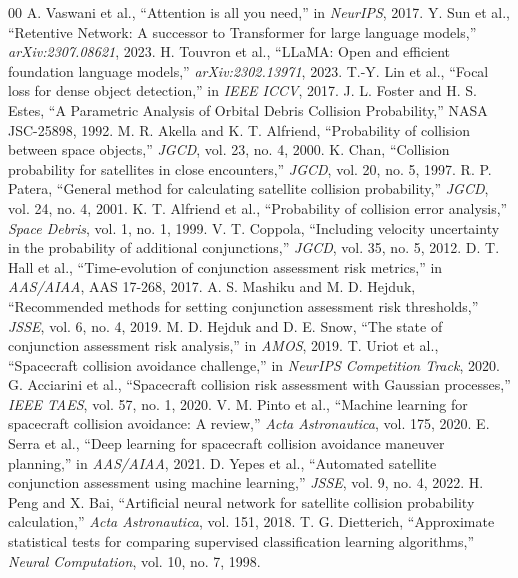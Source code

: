 \documentclass[conference]{IEEEtran}
\begin{document}
\begin{thebibliography}{00}
 A. Vaswani et al., ``Attention is all you need,'' in \textit{NeurIPS}, 2017.
 Y. Sun et al., ``Retentive Network: A successor to Transformer for large language models,'' \textit{arXiv:2307.08621}, 2023.
 H. Touvron et al., ``LLaMA: Open and efficient foundation language models,'' \textit{arXiv:2302.13971}, 2023.
 T.-Y. Lin et al., ``Focal loss for dense object detection,'' in \textit{IEEE ICCV}, 2017.
 J. L. Foster and H. S. Estes, ``A Parametric Analysis of Orbital Debris Collision Probability,'' NASA JSC-25898, 1992.
 M. R. Akella and K. T. Alfriend, ``Probability of collision between space objects,'' \textit{JGCD}, vol. 23, no. 4, 2000.
 K. Chan, ``Collision probability for satellites in close encounters,'' \textit{JGCD}, vol. 20, no. 5, 1997.
 R. P. Patera, ``General method for calculating satellite collision probability,'' \textit{JGCD}, vol. 24, no. 4, 2001.
 K. T. Alfriend et al., ``Probability of collision error analysis,'' \textit{Space Debris}, vol. 1, no. 1, 1999.
 V. T. Coppola, ``Including velocity uncertainty in the probability of additional conjunctions,'' \textit{JGCD}, vol. 35, no. 5, 2012.
 D. T. Hall et al., ``Time-evolution of conjunction assessment risk metrics,'' in \textit{AAS/AIAA}, AAS 17-268, 2017.
 A. S. Mashiku and M. D. Hejduk, ``Recommended methods for setting conjunction assessment risk thresholds,'' \textit{JSSE}, vol. 6, no. 4, 2019.
 M. D. Hejduk and D. E. Snow, ``The state of conjunction assessment risk analysis,'' in \textit{AMOS}, 2019.
 T. Uriot et al., ``Spacecraft collision avoidance challenge,'' in \textit{NeurIPS Competition Track}, 2020.
 G. Acciarini et al., ``Spacecraft collision risk assessment with Gaussian processes,'' \textit{IEEE TAES}, vol. 57, no. 1, 2020.
 V. M. Pinto et al., ``Machine learning for spacecraft collision avoidance: A review,'' \textit{Acta Astronautica}, vol. 175, 2020.
 E. Serra et al., ``Deep learning for spacecraft collision avoidance maneuver planning,'' in \textit{AAS/AIAA}, 2021.
 D. Yepes et al., ``Automated satellite conjunction assessment using machine learning,'' \textit{JSSE}, vol. 9, no. 4, 2022.
 H. Peng and X. Bai, ``Artificial neural network for satellite collision probability calculation,'' \textit{Acta Astronautica}, vol. 151, 2018.
 T. G. Dietterich, ``Approximate statistical tests for comparing supervised classification learning algorithms,'' \textit{Neural Computation}, vol. 10, no. 7, 1998.
\end{thebibliography}
\end{document}
